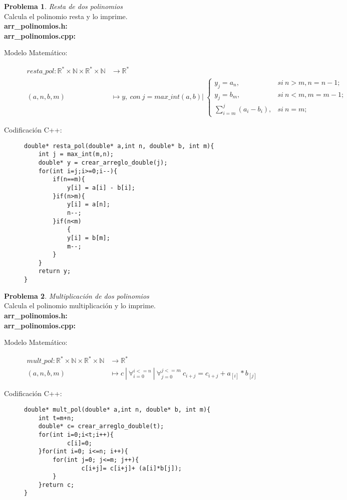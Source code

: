 \documentclass{article}
\theoremstyle{plain}
\theoremstyle{definition}
\newtheorem{problem}{Problema}
\begin{document}
\begin{problem} \emph{Resta de dos polinomios}\\
Calcula el polinomio resta y lo imprime.\\
\textbf{arr\_polinomios.h:}\ \\
\textbf{arr\_polinomios.cpp:}\ 
%
\begin{description}
\item[Modelo Matemático:]
%
\begin{align*}
resta\_pol: \mathbb{R}^*\times\mathbb{N}\times\mathbb{R}^*\times\mathbb{N} &\to \mathbb{R}^*\\
(a,n,b,m) &\mapsto y,\ con\ j=max\_int(a,b)|\
\begin{cases}
y_j = a_n,& si\ n>m, n= n-1;\\
y_j = b_m,& si\ n<m, m= m-1;\\
\sum_{i=m}^{j}(a_i - b_i),& si\ n=m;
\end{cases}
\end{align*}
%
\item[Codificación \textsf{C++}:]\hfill
%
\begin{verbatim}
double* resta_pol(double* a,int n, double* b, int m){
    int j = max_int(m,n);
    double* y = crear_arreglo_double(j);
    for(int i=j;i>=0;i--){
        if(n==m){
            y[i] = a[i] - b[i];
        }if(n>m){
            y[i] = a[n];
            n--;
        }if(n<m)
            {
            y[i] = b[m];
            m--;
        }
    }
    return y;
}
\end{verbatim}
\end{description}
\end{problem}

\begin{problem} \emph{Multiplicación de dos polinomios}\\
Calcula el polinomio multiplicación y lo imprime.\\
\textbf{arr\_polinomios.h:}\ \\
\textbf{arr\_polinomios.cpp:}\ 
%
\begin{description}
\item[Modelo Matemático:]
%
\begin{align*}
mult\_pol: \mathbb{R}^*\times\mathbb{N}\times\mathbb{R}^*\times\mathbb{N} &\to \mathbb{R}^*\\
(a,n,b,m) &\mapsto c\ |\ \forall_{i=0}^{i<=n} \ |\ \forall_{j=0}^{j<=m} \ c_{i+j} =c_{i+j}+a_{[i]}*b_{[j]}
\end{align*}
%
\item[Codificación \textsf{C++}:]\hfill
%
\begin{verbatim}
double* mult_pol(double* a,int n, double* b, int m){
    int t=m+n;
    double* c= crear_arreglo_double(t);
    for(int i=0;i<t;i++){
            c[i]=0;
    }for(int i=0; i<=n; i++){
        for(int j=0; j<=m; j++){
                c[i+j]= c[i+j]+ (a[i]*b[j]);
        }
    }return c;
}
\end{verbatim}
\end{description}
\end{problem}
\end{document}
